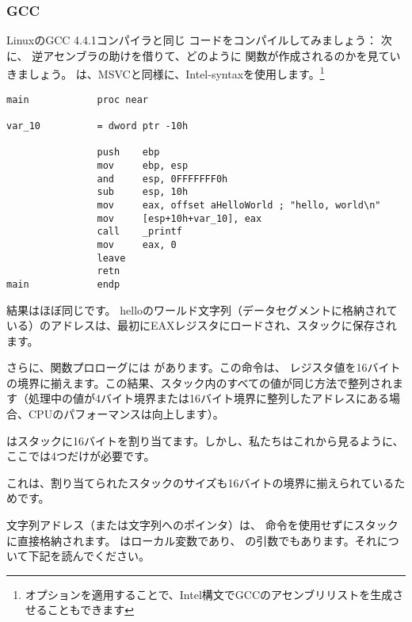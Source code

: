 \subsubsection{GCC}

LinuxのGCC 4.4.1コンパイラと同じ \CCpp コードをコンパイルしてみましょう：
次に、 \IDA 逆アセンブラの助けを借りて、どのように \main 関数が作成されるのかを見ていきましょう。
\IDA は、MSVCと同様に、Intel-syntaxを使用します。\footnote{オプションを適用することで、Intel構文でGCCのアセンブリリストを生成させることもできます}

\begin{lstlisting}[caption=code in \IDA,style=customasmx86]
main            proc near

var_10          = dword ptr -10h

                push    ebp
                mov     ebp, esp
                and     esp, 0FFFFFFF0h
                sub     esp, 10h
                mov     eax, offset aHelloWorld ; "hello, world\n"
                mov     [esp+10h+var_10], eax
                call    _printf
                mov     eax, 0
                leave
                retn
main            endp
\end{lstlisting}

結果はほぼ同じです。 helloのワールド文字列（データセグメントに格納されている）のアドレスは、最初にEAXレジスタにロードされ、スタックに保存されます。

さらに、関数プロローグには  があります。この命令は、 \ESP レジスタ値を16バイトの境界に揃えます。この結果、スタック内のすべての値が同じ方法で整列されます（処理中の値が4バイト境界または16バイト境界に整列したアドレスにある場合、CPUのパフォーマンスは向上します）。

 はスタックに16バイトを割り当てます。しかし、私たちはこれから見るように、ここでは4つだけが必要です。

これは、割り当てられたスタックのサイズも16バイトの境界に揃えられているためです。

文字列アドレス（または文字列へのポインタ）は、 \PUSH 命令を使用せずにスタックに直接格納されます。  はローカル変数であり、 \printf{} の引数でもあります。それについて下記を読んでください。

